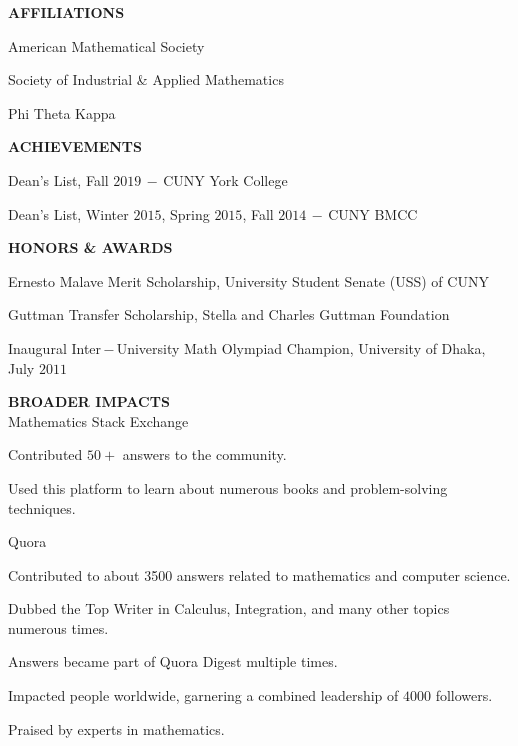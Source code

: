 \documentclass[a4paper, 12pt]{article}
\begin{document}
\begin{flushleft}
\faUser\quad\textbf{AFFILIATIONS}
\begin{compactitem}
    \item American Mathematical Society
    \item Society of Industrial \& Applied Mathematics
    \item Phi Theta Kappa
\end{compactitem}
\end{flushleft}

\begin{flushleft}
\faTrophy\quad\textbf{ACHIEVEMENTS}
\begin{compactitem}
    \item Dean's List, Fall $2019\,-\,$CUNY York College
    \item Dean's List, Winter $2015$, Spring $2015$, Fall $2014\,-\,$CUNY BMCC
\end{compactitem}
\end{flushleft}

\begin{flushleft}
\faAward\quad\textbf{HONORS \& AWARDS}
\begin{compactitem}
    \item Ernesto Malave Merit Scholarship, University Student Senate (USS) of CUNY
    \item Guttman Transfer Scholarship, Stella and Charles Guttman Foundation
    \item Inaugural Inter\,$-$\,University Math Olympiad Champion, University of Dhaka, July $2011$
\end{compactitem}
\end{flushleft}

\begin{flushleft}
\faTasks\quad\textbf{BROADER IMPACTS}\\
Mathematics Stack Exchange
\begin{compactitem}
    \item Contributed $50+$ answers to the community.
    \item Used this platform to learn about numerous books and problem-solving techniques.
\end{compactitem}

Quora
\begin{compactitem}
    \item Contributed to about 3500 answers related to mathematics and computer science.
    \item Dubbed the Top Writer in Calculus, Integration, and many other topics numerous times.
    \item Answers became part of Quora Digest multiple times.
    \item Impacted people worldwide, garnering a combined leadership of $4000$ followers.
    \item Praised by experts in mathematics.
\end{compactitem}
\end{flushleft}
\end{document}
